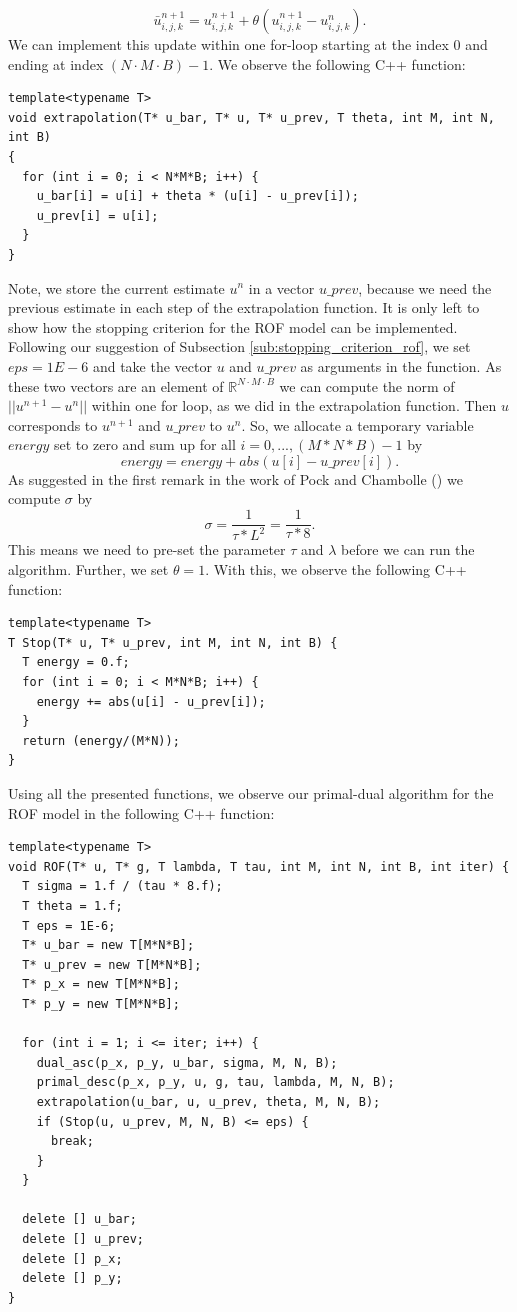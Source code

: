 \documentclass[abstracton]{scrreprt}
\begin{document}
                    $$
                        \bar{u}^{n+1}_{i,j,k} = u^{n+1}_{i,j,k} + \theta (u^{n+1}_{i,j,k} - u^{n}_{i,j,k}).
                    $$
                We can implement this update within one for-loop starting at the index $0$ and ending at index $(N \cdot M \cdot B)-1$. We observe the following C++ function:
                \begin{lstlisting}
template<typename T>
void extrapolation(T* u_bar, T* u, T* u_prev, T theta, int M, int N, int B)
{
  for (int i = 0; i < N*M*B; i++) {
    u_bar[i] = u[i] + theta * (u[i] - u_prev[i]);
    u_prev[i] = u[i];
  }
}
                \end{lstlisting}
                Note, we store the current estimate $u^{n}$ in a vector $u\_prev$, because we need the previous estimate in each step of the extrapolation function. It is only left to show how the stopping criterion for the ROF model can be implemented. Following our suggestion of Subsection \ref{sub:stopping_criterion_rof}, we set $eps = 1E-6$ and take the vector $u$ and $u\_prev$ as arguments in the function. As these two vectors are an element of $\mathbb{R}^{N \cdot M \cdot B}$ we can compute the norm of $||u^{n+1} - u^{n}||$ within one for loop, as we did in the extrapolation function. Then $u$ corresponds to $u^{n+1}$ and $u\_prev$ to $u^{n}$. So, we allocate a temporary variable $energy$ set to zero and sum up for all $i = 0, ..., (M*N*B)-1$ by
                    $$
                        energy = energy + abs(u[i] - u\_prev[i]).
                    $$
                As suggested in the first remark in the work of Pock and Chambolle (\cite{Chambolle10afirst-order}) we compute $\sigma$ by
                    $$
                        \sigma = \frac{1}{\tau * L^{2}} = \frac{1}{\tau * 8}.
                    $$
                This means we need to pre-set the parameter $\tau$ and $\lambda$ before we can run the algorithm. Further, we set $\theta = 1$.
                With this, we observe the following C++ function:
                \begin{lstlisting}
template<typename T>
T Stop(T* u, T* u_prev, int M, int N, int B) {
  T energy = 0.f;
  for (int i = 0; i < M*N*B; i++) {
    energy += abs(u[i] - u_prev[i]);
  }
  return (energy/(M*N));
}
                \end{lstlisting}
                Using all the presented functions, we observe our primal-dual algorithm for the ROF model in the following C++ function:\newpage
                \begin{lstlisting}
template<typename T>
void ROF(T* u, T* g, T lambda, T tau, int M, int N, int B, int iter) {
  T sigma = 1.f / (tau * 8.f);
  T theta = 1.f;
  T eps = 1E-6;
  T* u_bar = new T[M*N*B];
  T* u_prev = new T[M*N*B];
  T* p_x = new T[M*N*B];
  T* p_y = new T[M*N*B];
  
  for (int i = 1; i <= iter; i++) {
    dual_asc(p_x, p_y, u_bar, sigma, M, N, B);
    primal_desc(p_x, p_y, u, g, tau, lambda, M, N, B);
    extrapolation(u_bar, u, u_prev, theta, M, N, B);
    if (Stop(u, u_prev, M, N, B) <= eps) {
      break;
    }
  }

  delete [] u_bar;
  delete [] u_prev;
  delete [] p_x;
  delete [] p_y;
}
                \end{lstlisting}
\end{document}
